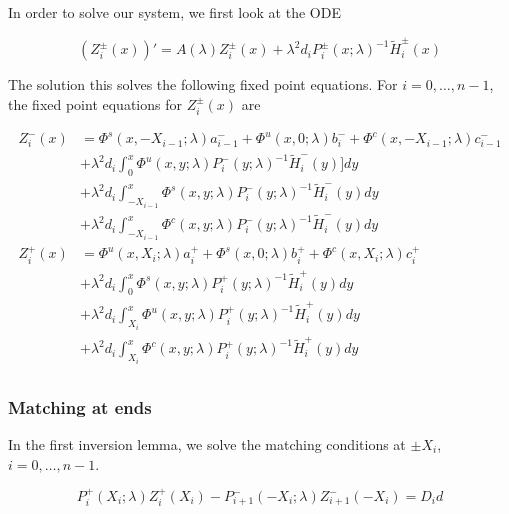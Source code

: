 \documentclass[12pt]{article}
\begin{document}
In order to solve our system, we first look at the ODE

\[
(Z_i^\pm(x))' = A(\lambda) Z_i^\pm(x) + \lambda^2 d_i P_i^\pm(x; \lambda)^{-1} \tilde{H}_i^\pm(x)
\]

The solution this solves the following fixed point equations. For $i = 0, \dots, n-1$, the fixed point equations for $Z_i^\pm(x)$ are

\begin{align*}
Z_i^-(x) &= \Phi^s(x, -X_{i-1}; \lambda) a_{i-1}^- + \Phi^u(x, 0; \lambda) b_i^- + \Phi^c(x, -X_{i-1}; \lambda) c_{i-1}^- \\
&+ \lambda^2 d_i \int_0^x \Phi^u(x, y; \lambda) P_i^-(y; \lambda)^{-1} \tilde{H}_i^-(y)] dy \\
&+ \lambda^2 d_i \int_{-X_{i-1}}^x \Phi^s(x, y; \lambda) P_i^-(y; \lambda)^{-1} \tilde{H}_i^-(y) dy \\
&+ \lambda^2 d_i \int_{-X_{i-1}}^x \Phi^c(x, y; \lambda) P_i^-(y; \lambda)^{-1} \tilde{H}_i^-(y) dy  \\ 
Z_i^+(x) &= \Phi^u(x, X_i; \lambda) a_i^+ + \Phi^s(x, 0; \lambda) b_i^+ + \Phi^c(x, X_i; \lambda) c_i^+ \\
&+ \lambda^2 d_i \int_0^x \Phi^s(x, y; \lambda) P_i^+(y; \lambda)^{-1} \tilde{H}_i^+(y) dy \\
&+ \lambda^2 d_i \int_{X_i}^x \Phi^u(x, y; \lambda) P_i^+(y; \lambda)^{-1} \tilde{H}_i^+(y) dy \\
&+ \lambda^2 d_i \int_{X_i}^x \Phi^c(x, y; \lambda) P_i^+(y; \lambda)^{-1} \tilde{H}_i^+(y) dy \\
\end{align*}


\subsubsection{Matching at ends}

In the first inversion lemma, we solve the matching conditions at $\pm X_i$, $i = 0, \dots, n-1$.

\[
P_i^+(X_i; \lambda) Z_i^+(X_i) - P_{i+1}^-(-X_i; \lambda) Z_{i+1}^-(-X_i) = D_i d
\]

\end{document}
